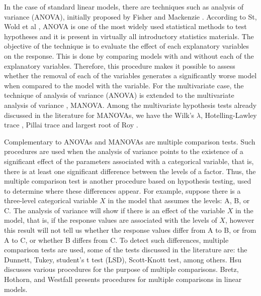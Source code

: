 \documentclass[Review,sagev,times, doublespace]{sagej}
\begin{document}

In the case of standard linear models, there are techniques such as analysis of variance (ANOVA), initially proposed by Fisher and Mackenzie \cite{anova_fisher}. According to St, Wold et al \cite{anova1}, ANOVA is one of the most widely used statistical methods to test hypotheses and it is present in virtually all introductory statistics materials. The objective of the technique is to evaluate the effect of each explanatory variables on the response. This is done by comparing models with and without each of the explanatory variables. Therefore, this procedure makes it possible to assess whether the removal of each of the variables generates a significantly worse model when compared to the model with the variable. For the multivariate case, the technique of analysis of variance (ANOVA) is extended to the multivariate analysis of variance \citep{manova}, MANOVA. Among the multivariate hypothesis tests already discussed in the literature for MANOVAs, we have the Wilk's \cite{wilks} $\lambda$, Hotelling-Lawley trace \cite{lawley,hotelling}, Pillai trace \cite{pillai} and largest root of Roy \cite{roy}. 


Complementary to ANOVAs and MANOVAs are multiple comparison tests. Such procedures are used when the analysis of variance points to the existence of a significant effect of the parameters associated with a categorical variable, that is, there is at least one significant difference between the levels of a factor. Thus, the multiple comparison test is another procedure based on hypothesis testing, used to determine where these differences appear. For example, suppose there is a three-level categorical variable $X$ in the model that assumes the levels: A, B, or C. The analysis of variance will show if there is an effect of the variable $X$ in the model, that is, if the response values are associated with the levels of $X$, however this result will not tell us whether the response values differ from A to B, or from A to C, or whether B differs from C. To detect such differences, multiple comparison tests are used, some of the tests discussed in the literature are: the Dunnett, Tukey, student's t test (LSD), Scott-Knott test, among others. Hsu \cite{hsu1996multiple} discusses various procedures for the purpose of multiple comparisons. Bretz, Hothorn, and Westfall \cite{bretz2008multiple} presents procedures for multiple comparisons in linear models.

\end{document}
